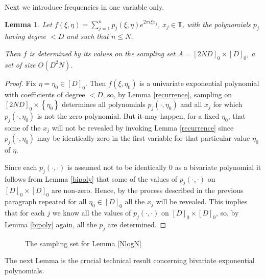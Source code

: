 \documentclass[12pt,a4paper,oneside]{amsart}
\newtheorem{lemma}{Lemma}[section]
\theoremstyle{definition}
\newcommand{\Set}[1]{{\left\{{#1}\right\}}}
\newcommand{\TT}{{\mathbb T}}
\newcommand{\red}[1]{{#1}}
\newcounter{rem}
\begin{document}
Next we introduce frequencies in one variable only.

\begin{lemma}\label{unifreq}
Let $f(\xi,\eta) = \sum_{j=1}^n p_j (\xi,\eta) e^{2\pi i \xi x_j}$\red{, $x_j\in\TT$,} with the polynomials $p_j$ having degree $< D$ and such that $n \le N$.

Then $f$ is determined by its values on the sampling set $A = [2 N D]_0 \times [D]_0$, a set of size $O(D^2 N)$.
\end{lemma}

\begin{proof}
Fix $\eta = \eta_0 \in [D]_0$. Then $f(\xi, \eta_0)$ is a univariate exponential polynomial with coefficients of degree $<D$, so, by Lemma \ref{recurrence}, sampling on $[2ND]_0 \times \Set{\eta_0}$ determines all polynomials $p_j(\cdot, \eta_0)$ and all $x_j$ for which $p_j(\cdot, \eta_0)$ is not the zero polynomial. But it may happen, for a fixed $\eta_0$, that some of the $x_j$ will not be revealed by invoking Lemma \ref{recurrence} since $p_j(\cdot, \eta_0)$ may be identically zero in the first variable for that particular value $\eta_0$ of $\eta$.

Since each $p_j(\cdot, \cdot)$ is assumed not to be identically 0 as a bivariate polynomial it follows from Lemma \ref{bipoly} that some of the values of $p_j(\cdot, \cdot)$ on $[D]_0 \times [D]_0$ are non-zero. Hence, by the process described in the previous paragraph repeated for all $\eta_0 \in [D]_0$ all the $x_j$ will be revealed. This implies that for each $j$ we know all the values of $p_j(\cdot, \cdot)$ on $[D]_0 \times [D]_0$, so, by Lemma \ref{bipoly} again, all the $p_j$ are determined.

\end{proof}


\begin{figure}[h]

\caption{The sampling set for Lemma \ref{NlogN}}
\label{fig:samples}
\end{figure}

The next Lemma is the crucial technical result concerning bivariate exponential polynomials.
\end{document}
